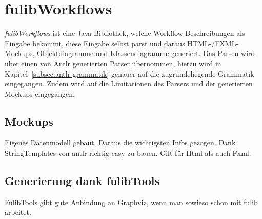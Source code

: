\section{fulibWorkflows}\label{sec:fulibworkflows2}
\textit{fulibWorkflows} ist eine Java-Bibliothek, welche Workflow Beschreibungen als Eingabe bekommt, diese Eingabe
selbst parst und daraus HTML-/FXML-Mockups, Objektdiagramme und Klassendiagramme generiert.
Das Parsen wird über einen von Antlr generierten Parser übernommen, hierzu wird in Kapitel~\ref{subsec:antlr-grammatik} genauer auf
die zugrundeliegende Grammatik eingegangen.
Zudem wird auf die Limitationen des Parsers und der generierten Mockups eingegangen.








\subsection{Mockups}\label{subsec:mockups}
Eigenes Datenmodell gebaut.
Daraus die wichtigsten Infos gezogen.
Dank StringTemplates von antlr richtig easy zu bauen.
Gilt für Html als auch Fxml.

\subsection{Generierung dank fulibTools}\label{subsec:generierung-dank-fulibtools}
FulibTools gibt gute Anbindung an Graphviz, wenn man sowieso schon mit fulib arbeitet.
